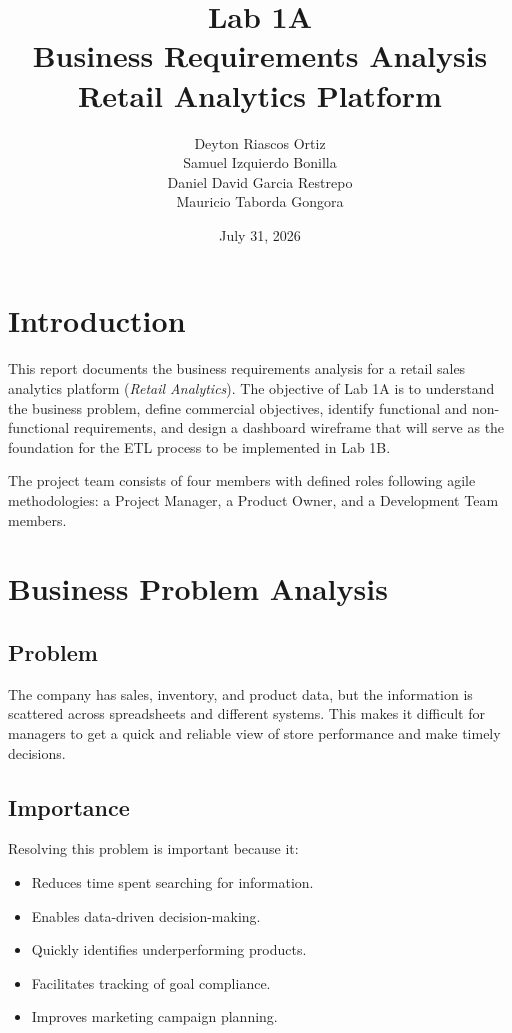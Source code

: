 \documentclass[12pt,a4paper]{article}
\title{
Lab 1A\\
Business Requirements Analysis\\
Retail Analytics Platform
}
\author{
Deyton Riascos Ortiz\\
Samuel Izquierdo Bonilla\\
Daniel David Garcia Restrepo\\
Mauricio Taborda Gongora
}
\date{July 31, 2026}
\begin{document}
\maketitle

\tableofcontents

\newpage

\section{Introduction}

This report documents the business requirements analysis for a retail sales analytics platform (\textit{Retail Analytics}). The objective of Lab 1A is to understand the business problem, define commercial objectives, identify functional and non-functional requirements, and design a dashboard wireframe that will serve as the foundation for the ETL process to be implemented in Lab 1B.

The project team consists of four members with defined roles following agile methodologies: a Project Manager, a Product Owner, and a Development Team members.

\section{Business Problem Analysis}

\subsection{Problem}

The company has sales, inventory, and product data, but the information is scattered across spreadsheets and different systems. This makes it difficult for managers to get a quick and reliable view of store performance and make timely decisions.

\subsection{Importance}

Resolving this problem is important because it:
\begin{itemize}[nosep]
    \item Reduces time spent searching for information.
    \item Enables data-driven decision-making.
    \item Quickly identifies underperforming products.
    \item Facilitates tracking of goal compliance.
    \item Improves marketing campaign planning.
\end{itemize}
\end{document}
